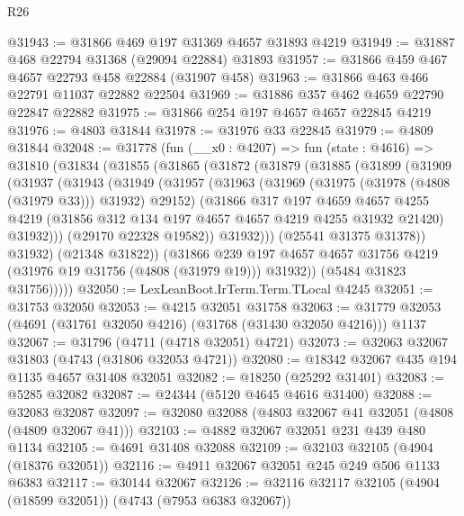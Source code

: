 \begin{lexlean}{R26}
\begin{coremodule}
@31943 := @31866 @469 @197 @31369 @4657 @31893 @4219
@31949 := @31887 @468 @22794 @31368 (@29094 @22884) @31893
@31957 := @31866 @459 @467 @4657 @22793 @458 @22884 (@31907 @458)
@31963 := @31866 @463 @466 @22791 @11037 @22882 @22504
@31969 := @31886 @357 @462 @4659 @22790 @22847 @22882
@31975 := @31866 @254 @197 @4657 @4657 @22845 @4219
@31976 := @4803 @31844
@31978 := @31976 @33 @22845
@31979 := @4809 @31844
@32048 := @31778
    (fun (__x0 : @4207) =>
    fun (state : @4616) =>
    @31810
      (@31834
        (@31855
          (@31865
            (@31872
              (@31879
                (@31885
                  (@31899
                    (@31909
                      (@31937
                        (@31943
                          (@31949
                            (@31957
                              (@31963
                                (@31969 (@31975 (@31978 (@4808 (@31979 @33))) @31932) @29152)
                                (@31866
                                  @317
                                  @197
                                  @4659
                                  @4657
                                  @4255
                                  @4219
                                  (@31856 @312 @134 @197 @4657 @4657 @4219 @4255 @31932 @21420)
                                  @31932)))
                            (@29170 @22328 @19582))
                          @31932)))
                    (@25541 @31375 @31378))
                  @31932)
                (@21348 @31822))
              (@31866
                @239
                @197
                @4657
                @4657
                @31756
                @4219
                (@31976 @19 @31756 (@4808 (@31979 @19)))
                @31932))
            (@5484 @31823 @31756)))))
@32050 := LexLeanBoot.IrTerm.Term.TLocal @4245
@32051 := @31753 @32050
@32053 := @4215 @32051 @31758
@32063 := @31779 @32053 (@4691 (@31761 @32050 @4216) (@31768 (@31430 @32050 @4216))) @1137
@32067 := @31796 (@4711 (@4718 @32051) @4721)
@32073 := @32063 @32067 @31803 (@4743 (@31806 @32053 @4721))
@32080 := @18342 @32067 @435 @194 @1135 @4657 @31408 @32051
@32082 := @18250 (@25292 @31401)
@32083 := @5285 @32082
@32087 := @24344 (@5120 @4645 @4616 @31400)
@32088 := @32083 @32087
@32097 := @32080 @32088 (@4803 @32067 @41 @32051 (@4808 (@4809 @32067 @41)))
@32103 := @4882 @32067 @32051 @231 @439 @480 @1134
@32105 := @4691 @31408 @32088
@32109 := @32103 @32105 (@4904 (@18376 @32051))
@32116 := @4911 @32067 @32051 @245 @249 @506 @1133 @6383
@32117 := @30144 @32067
@32126 := @32116 @32117 @32105 (@4904 (@18599 @32051)) (@4743 (@7953 @6383 @32067))

\end{coremodule}
\end{lexlean}
